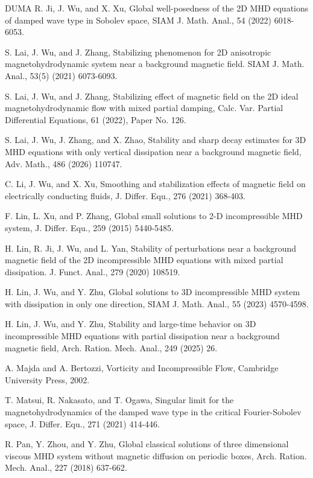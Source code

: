 \documentclass[reqno,11pt]{amsart}
\numberwithin{Thm}{section}
\begin{document}
\begin {thebibliography}{DUMA}
 R. Ji, J. Wu, and X. Xu, Global well-posedness of the 2D MHD equations of damped wave type in Sobolev space, SIAM J. Math. Anal., 54 (2022) 6018-6053.


 S. Lai, J. Wu, and J. Zhang, Stabilizing phenomenon for 2D anisotropic magnetohydrodynamic system near a background
magnetic field. SIAM J. Math. Anal., 53(5) (2021) 6073-6093.

 S. Lai, J. Wu, and J. Zhang, Stabilizing effect of magnetic field on the 2D ideal magnetohydrodynamic
flow with mixed partial damping, Calc. Var. Partial Differential Equations, 61 (2022), Paper No. 126.

 S. Lai, J. Wu, J. Zhang, and X. Zhao, Stability and sharp decay estimates for 3D MHD equations with only vertical dissipation near a background magnetic field, Adv. Math., 486 (2026) 110747.

 C. Li, J. Wu, and X. Xu, Smoothing and stabilization effects of
magnetic field on electrically conducting fluids, J. Differ. Equ., 276
(2021) 368-403.

 F. Lin, L. Xu, and P. Zhang, Global small solutions to 2-D incompressible
MHD system, J. Differ. Equ., 259 (2015) 5440-5485.


 H. Lin, R. Ji, J. Wu, and L. Yan, Stability of perturbations near a background magnetic field of the 2D incompressible MHD equations with mixed partial dissipation. J. Funct. Anal., 279 (2020) 108519.

 H. Lin, J. Wu, and Y. Zhu, Global solutions to 3D incompressible MHD system with dissipation
in only one direction, SIAM J. Math. Anal., 55 (2023) 4570-4598.

 H. Lin, J. Wu, and Y. Zhu, Stability and large-time behavior on 3D incompressible MHD equations with partial dissipation near a background magnetic field, Arch. Ration. Mech. Anal., 249 (2025) 26.

  A. Majda and A. Bertozzi, Vorticity and Incompressible Flow, Cambridge University Press, 2002.

  T. Matsui, R. Nakasato, and T. Ogawa, Singular limit for the magnetohydrodynamics of the damped wave type in the critical Fourier-Sobolev space, J. Differ. Equ., 271 (2021) 414-446.

 R. Pan, Y. Zhou, and Y. Zhu, Global classical solutions of three
dimensional viscous MHD system without magnetic diffusion on periodic boxes, Arch.
Ration. Mech. Anal., 227 (2018) 637-662.


\end{thebibliography}
\end{document}
